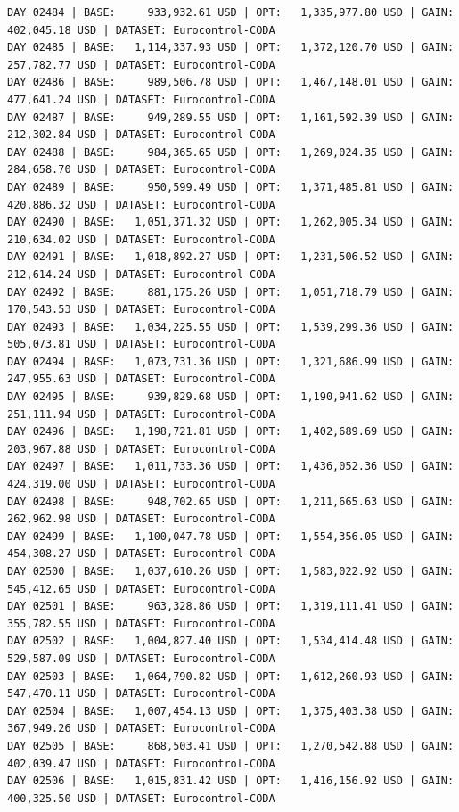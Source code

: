 \documentclass[11pt,a4paper]{article}
\begin{document}
\begin{verbatim}
DAY 02484 | BASE:     933,932.61 USD | OPT:   1,335,977.80 USD | GAIN: 402,045.18 USD | DATASET: Eurocontrol-CODA
DAY 02485 | BASE:   1,114,337.93 USD | OPT:   1,372,120.70 USD | GAIN: 257,782.77 USD | DATASET: Eurocontrol-CODA
DAY 02486 | BASE:     989,506.78 USD | OPT:   1,467,148.01 USD | GAIN: 477,641.24 USD | DATASET: Eurocontrol-CODA
DAY 02487 | BASE:     949,289.55 USD | OPT:   1,161,592.39 USD | GAIN: 212,302.84 USD | DATASET: Eurocontrol-CODA
DAY 02488 | BASE:     984,365.65 USD | OPT:   1,269,024.35 USD | GAIN: 284,658.70 USD | DATASET: Eurocontrol-CODA
DAY 02489 | BASE:     950,599.49 USD | OPT:   1,371,485.81 USD | GAIN: 420,886.32 USD | DATASET: Eurocontrol-CODA
DAY 02490 | BASE:   1,051,371.32 USD | OPT:   1,262,005.34 USD | GAIN: 210,634.02 USD | DATASET: Eurocontrol-CODA
DAY 02491 | BASE:   1,018,892.27 USD | OPT:   1,231,506.52 USD | GAIN: 212,614.24 USD | DATASET: Eurocontrol-CODA
DAY 02492 | BASE:     881,175.26 USD | OPT:   1,051,718.79 USD | GAIN: 170,543.53 USD | DATASET: Eurocontrol-CODA
DAY 02493 | BASE:   1,034,225.55 USD | OPT:   1,539,299.36 USD | GAIN: 505,073.81 USD | DATASET: Eurocontrol-CODA
DAY 02494 | BASE:   1,073,731.36 USD | OPT:   1,321,686.99 USD | GAIN: 247,955.63 USD | DATASET: Eurocontrol-CODA
DAY 02495 | BASE:     939,829.68 USD | OPT:   1,190,941.62 USD | GAIN: 251,111.94 USD | DATASET: Eurocontrol-CODA
DAY 02496 | BASE:   1,198,721.81 USD | OPT:   1,402,689.69 USD | GAIN: 203,967.88 USD | DATASET: Eurocontrol-CODA
DAY 02497 | BASE:   1,011,733.36 USD | OPT:   1,436,052.36 USD | GAIN: 424,319.00 USD | DATASET: Eurocontrol-CODA
DAY 02498 | BASE:     948,702.65 USD | OPT:   1,211,665.63 USD | GAIN: 262,962.98 USD | DATASET: Eurocontrol-CODA
DAY 02499 | BASE:   1,100,047.78 USD | OPT:   1,554,356.05 USD | GAIN: 454,308.27 USD | DATASET: Eurocontrol-CODA
DAY 02500 | BASE:   1,037,610.26 USD | OPT:   1,583,022.92 USD | GAIN: 545,412.65 USD | DATASET: Eurocontrol-CODA
DAY 02501 | BASE:     963,328.86 USD | OPT:   1,319,111.41 USD | GAIN: 355,782.55 USD | DATASET: Eurocontrol-CODA
DAY 02502 | BASE:   1,004,827.40 USD | OPT:   1,534,414.48 USD | GAIN: 529,587.09 USD | DATASET: Eurocontrol-CODA
DAY 02503 | BASE:   1,064,790.82 USD | OPT:   1,612,260.93 USD | GAIN: 547,470.11 USD | DATASET: Eurocontrol-CODA
DAY 02504 | BASE:   1,007,454.13 USD | OPT:   1,375,403.38 USD | GAIN: 367,949.26 USD | DATASET: Eurocontrol-CODA
DAY 02505 | BASE:     868,503.41 USD | OPT:   1,270,542.88 USD | GAIN: 402,039.47 USD | DATASET: Eurocontrol-CODA
DAY 02506 | BASE:   1,015,831.42 USD | OPT:   1,416,156.92 USD | GAIN: 400,325.50 USD | DATASET: Eurocontrol-CODA

\end{verbatim}
\end{document}
